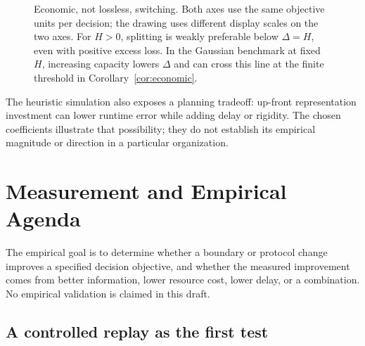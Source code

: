 \documentclass[11pt]{article}
\begin{document}
\begin{figure}[htbp]
\centering
{}
\caption{Economic, not lossless, switching. Both axes use the same objective
units per decision; the drawing uses different display scales on the two
axes. For $H>0$, splitting is weakly preferable below $\Delta=H$, even with
positive excess loss. In the Gaussian benchmark at fixed $H$, increasing
capacity lowers $\Delta$ and can cross this line at the finite threshold in
Corollary~\ref{cor:economic}.}
\label{fig:regimes}
\end{figure}

The heuristic simulation also exposes a planning tradeoff: up-front
representation investment can lower runtime error while adding delay or
rigidity. The chosen coefficients illustrate that possibility; they do not
establish its empirical magnitude or direction in a particular organization.


\section{Measurement and Empirical Agenda}
\label{sec:measurement}

The empirical goal is to determine whether a boundary or protocol change
improves a specified decision objective, and whether the measured improvement
comes from better information, lower resource cost, lower delay, or a
combination. No empirical validation is claimed in this draft.

\subsection{A controlled replay as the first test}
\end{document}
